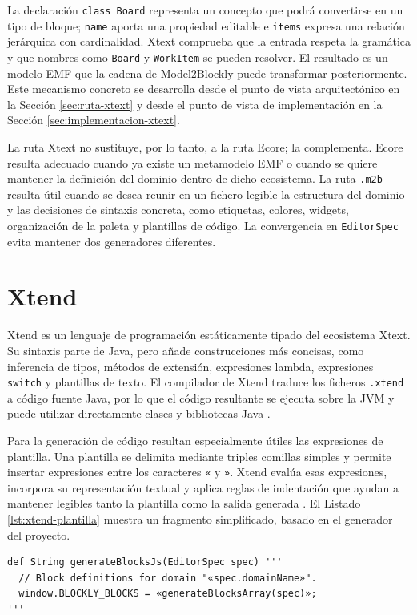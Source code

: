 La declaración \texttt{class Board} representa un concepto que podrá convertirse
en un tipo de bloque; \texttt{name} aporta una propiedad editable e
\texttt{items} expresa una relación jerárquica con cardinalidad. Xtext
comprueba que la entrada respeta la gramática y que nombres como
\texttt{Board} y \texttt{WorkItem} se pueden resolver. El resultado es un
modelo EMF que la cadena de Model2Blockly puede transformar posteriormente.
Este mecanismo concreto se desarrolla desde el punto de vista arquitectónico
en la Sección \ref{sec:ruta-xtext} y desde el punto de vista de implementación
en la Sección \ref{sec:implementacion-xtext}.

La ruta Xtext no sustituye, por lo tanto, a la ruta Ecore; la complementa. Ecore
resulta adecuado cuando ya existe un metamodelo EMF o cuando se quiere mantener
la definición del dominio dentro de dicho ecosistema. La ruta \texttt{.m2b}
resulta útil cuando se desea reunir en un fichero legible la estructura del
dominio y las decisiones de sintaxis concreta, como etiquetas, colores,
widgets, organización de la paleta y plantillas de código. La convergencia en
\texttt{EditorSpec} evita mantener dos generadores diferentes.

\section{Xtend}
\label{sec:xtend}

Xtend es un lenguaje de programación estáticamente tipado del ecosistema Xtext.
Su sintaxis parte de Java, pero añade construcciones más concisas, como
inferencia de tipos, métodos de extensión, expresiones lambda, expresiones
\texttt{switch} y plantillas de texto. El compilador de Xtend traduce los
ficheros \texttt{.xtend} a código fuente Java, por lo que el código resultante se
ejecuta sobre la JVM y puede utilizar directamente clases y bibliotecas Java
\cite{xtendDocs}.

Para la generación de código resultan especialmente útiles las expresiones de
plantilla. Una plantilla se delimita mediante triples comillas simples y permite
insertar expresiones entre los caracteres \texttt{«} y \texttt{»}. Xtend evalúa
esas expresiones, incorpora su representación textual y aplica reglas de
indentación que ayudan a mantener legibles tanto la plantilla como la salida
generada \cite{xtendDocs}. El Listado \ref{lst:xtend-plantilla} muestra un
fragmento simplificado, basado en el generador del proyecto.

\begin{lstlisting}[style=tfmxtend, caption={Ejemplo de una plantilla Xtend usada para generar JavaScript}, label={lst:xtend-plantilla}]
def String generateBlocksJs(EditorSpec spec) '''
  // Block definitions for domain "«spec.domainName»".
  window.BLOCKLY_BLOCKS = «generateBlocksArray(spec)»;
'''
\end{lstlisting}

